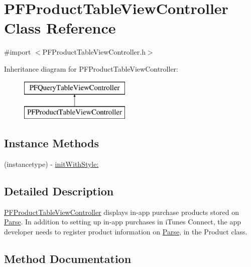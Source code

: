 \hypertarget{interface_p_f_product_table_view_controller}{}\section{P\+F\+Product\+Table\+View\+Controller Class Reference}
\label{interface_p_f_product_table_view_controller}


{\ttfamily \#import $<$P\+F\+Product\+Table\+View\+Controller.\+h$>$}

Inheritance diagram for P\+F\+Product\+Table\+View\+Controller\+:\begin{figure}[H]
\begin{center}
\leavevmode
\includegraphics[height=2.000000cm]{interface_p_f_product_table_view_controller}
\end{center}
\end{figure}
\subsection*{Instance Methods}
\begin{DoxyCompactItemize}
\item 
(instancetype) -\/ \hyperlink{interface_p_f_product_table_view_controller_a654dc66b0660fab1cb10458e06920836}{init\+With\+Style\+:}
\end{DoxyCompactItemize}


\subsection{Detailed Description}
{\ttfamily \hyperlink{interface_p_f_product_table_view_controller}{P\+F\+Product\+Table\+View\+Controller}} displays in-\/app purchase products stored on \hyperlink{interface_parse}{Parse}. In addition to setting up in-\/app purchases in i\+Tunes Connect, the app developer needs to register product information on \hyperlink{interface_parse}{Parse}, in the Product class. 

\subsection{Method Documentation}
\hypertarget{interface_p_f_product_table_view_controller_a654dc66b0660fab1cb10458e06920836}{}
